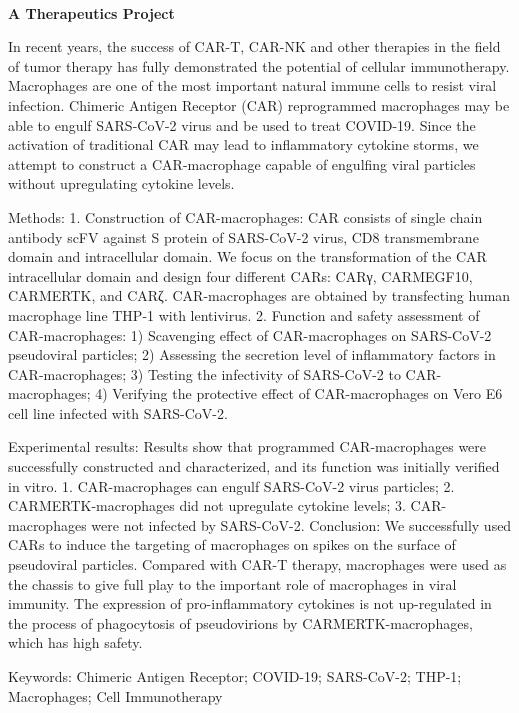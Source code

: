 \textbf{\\A Therapeutics Project\\}\begin{spacing}{1.5}

In recent years, the success of CAR-T, CAR-NK and other therapies in the field of tumor therapy has fully demonstrated the potential of cellular immunotherapy. Macrophages are one of the most important natural immune cells to resist viral infection. Chimeric Antigen Receptor (CAR) reprogrammed macrophages may be able to engulf SARS-CoV-2 virus and be used to treat COVID-19. Since the activation of traditional CAR may lead to inflammatory cytokine storms, we attempt to construct a CAR-macrophage capable of engulfing viral particles without upregulating cytokine levels.

Methods: 1. Construction of CAR-macrophages: CAR consists of single chain antibody scFV against S protein of SARS-CoV-2 virus, CD8 transmembrane domain and intracellular domain. We focus on the transformation of the CAR intracellular domain and design four different CARs: CARγ, CARMEGF10, CARMERTK, and CARζ. CAR-macrophages are obtained by transfecting human macrophage line THP-1 with lentivirus. 2. Function and safety assessment of CAR-macrophages: 1) Scavenging effect of CAR-macrophages on SARS-CoV-2 pseudoviral particles; 2) Assessing the secretion level of inflammatory factors in CAR-macrophages; 3) Testing the infectivity of SARS-CoV-2 to CAR-macrophages; 4) Verifying the protective effect of CAR-macrophages on Vero E6 cell line infected with SARS-CoV-2.

Experimental results: Results show that programmed CAR-macrophages were successfully constructed and characterized, and its function was initially verified in vitro. 1. CAR-macrophages can engulf SARS-CoV-2 virus particles; 2. CARMERTK-macrophages did not upregulate cytokine levels; 3. CAR-macrophages were not infected by SARS-CoV-2. Conclusion: We successfully used CARs to induce the targeting of macrophages on spikes on the surface of pseudoviral particles. Compared with CAR-T therapy, macrophages were used as the chassis to give full play to the important role of macrophages in viral immunity. The expression of pro-inflammatory cytokines is not up-regulated in the process of phagocytosis of pseudovirions by CARMERTK-macrophages, which has high safety.

Keywords: Chimeric Antigen Receptor; COVID-19; SARS-CoV-2; THP-1; Macrophages; Cell Immunotherapy\end{spacing}
\\

